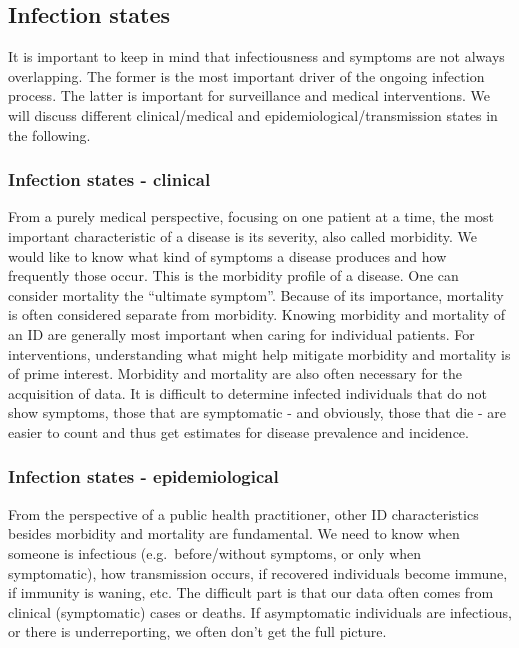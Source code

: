 \documentclass[]{article}
\theoremstyle{definition}
\theoremstyle{definition}
\theoremstyle{definition}
\theoremstyle{remark}
\begin{document}
\subsection{Infection states}\label{infection-states}

It is important to keep in mind that infectiousness and symptoms are not
always overlapping. The former is the most important driver of the
ongoing infection process. The latter is important for surveillance and
medical interventions. We will discuss different clinical/medical and
epidemiological/transmission states in the following.

\subsubsection{Infection states -
clinical}\label{infection-states---clinical}

From a purely medical perspective, focusing on one patient at a time,
the most important characteristic of a disease is its severity, also
called morbidity. We would like to know what kind of symptoms a disease
produces and how frequently those occur. This is the morbidity profile
of a disease. One can consider mortality the ``ultimate symptom''.
Because of its importance, mortality is often considered separate from
morbidity. Knowing morbidity and mortality of an ID are generally most
important when caring for individual patients. For interventions,
understanding what might help mitigate morbidity and mortality is of
prime interest. Morbidity and mortality are also often necessary for the
acquisition of data. It is difficult to determine infected individuals
that do not show symptoms, those that are symptomatic - and obviously,
those that die - are easier to count and thus get estimates for disease
prevalence and incidence.

\subsubsection{Infection states -
epidemiological}\label{infection-states---epidemiological}

From the perspective of a public health practitioner, other ID
characteristics besides morbidity and mortality are fundamental. We need
to know when someone is infectious (e.g.~before/without symptoms, or
only when symptomatic), how transmission occurs, if recovered
individuals become immune, if immunity is waning, etc. The difficult
part is that our data often comes from clinical (symptomatic) cases or
deaths. If asymptomatic individuals are infectious, or there is
underreporting, we often don't get the full picture.
\end{document}
